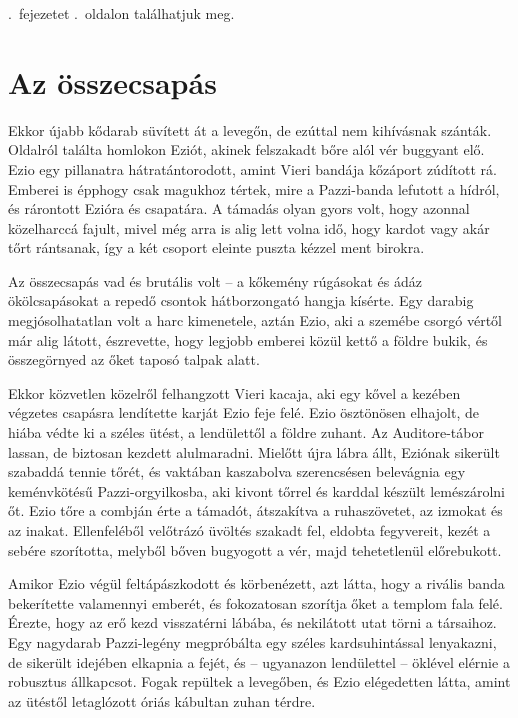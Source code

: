 \documentclass{thesis-ekf}
\theoremstyle{definition}
\theoremstyle{remark}
\begin{document}
\Az{\ref{2-fej}}.~fejezetet \az{\pageref{2-fej}}.~oldalon találhatjuk meg.

\section{Az összecsapás}
Ekkor  újabb  kődarab  süvített  át  a  levegőn,  de  ezúttal  nem 
kihívásnak  szánták.  Oldalról  találta  homlokon  Eziót,  akinek 
felszakadt  bőre  alól  vér  buggyant  elő.  Ezio  egy  pillanatra 
hátratántorodott, amint Vieri bandája kőzáport zúdított rá. Emberei is 
épphogy csak magukhoz tértek, mire a Pazzi-banda lefutott a hídról, 
és rárontott Ezióra és csapatára. A támadás olyan gyors volt, hogy 
azonnal közelharccá fajult, mivel még arra is alig lett volna idő, hogy 
kardot  vagy  akár  tőrt  rántsanak,  így  a  két  csoport  eleinte  puszta kézzel ment birokra. 

Az összecsapás vad és brutális volt -- a kőkemény rúgásokat és 
ádáz ökölcsapásokat a repedő csontok hátborzongató hangja kísérte. 
Egy darabig megjósolhatatlan volt a harc kimenetele, aztán Ezio, aki 
a  szemébe  csorgó  vértől  már  alig  látott,  észrevette,  hogy  legjobb emberei közül kettő a földre bukik, és összegörnyed az őket taposó talpak alatt. 

Ekkor közvetlen közelről felhangzott Vieri kacaja, aki 
egy kővel a kezében végzetes csapásra lendítette karját Ezio feje felé. 
Ezio  ösztönösen  elhajolt,  de  hiába  védte  ki  a  széles  ütést,  a 
lendülettől  a  földre  zuhant.  Az  Auditore-tábor  lassan,  de  biztosan kezdett  alulmaradni.  Mielőtt  újra  lábra  állt,  Eziónak  sikerült szabaddá  tennie  tőrét,  és  vaktában  kaszabolva  szerencsésen 
belevágnia egy keménvkötésű Pazzi-orgyilkosba, aki kivont tőrrel és 
karddal készült lemészárolni őt. Ezio tőre a combján érte a támadót, 
átszakítva  a  ruhaszövetet,  az  izmokat  és  az  inakat.  Ellenfeléből 
velőtrázó  üvöltés  szakadt  fel,  eldobta  fegyvereit,  kezét  a  sebére 
szorította,  melyből  bőven  bugyogott  a  vér,  majd  tehetetlenül előrebukott.

Amikor Ezio végül feltápászkodott és körbenézett, azt látta, hogy a 
rivális banda bekerítette valamennyi emberét, és fokozatosan szorítja 
őket a templom fala felé. Érezte, hogy az erő kezd visszatérni lábába, 
és  nekilátott  utat  törni  a  társaihoz.  Egy  nagydarab  Pazzi-legény 
megpróbálta  egy  széles  kardsuhintással  lenyakazni,  de  sikerült 
idejében elkapnia a fejét, és -- ugyanazon lendülettel -- öklével elérnie 
a  robusztus  állkapcsot.  Fogak  repültek  a  levegőben,  és  Ezio 
elégedetten látta, amint az ütéstől letaglózott óriás kábultan zuhan 
térdre.  
\end{document}
